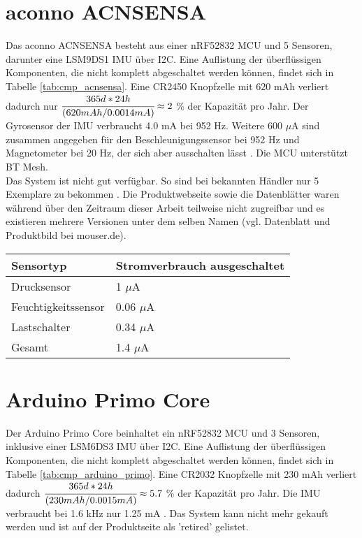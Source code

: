 \section{aconno ACNSENSA}
Das aconno ACNSENSA besteht aus einer nRF52832 MCU und 5 Sensoren, darunter eine LSM9DS1 IMU über I2C.
Eine Auflistung der überflüssigen Komponenten, die nicht komplett abgeschaltet werden können, findet sich in Tabelle \ref{tab:cmp_acnsensa}.
Eine CR2450 Knopfzelle mit 620 mAh verliert dadurch nur $\cfrac{365d*24h}{(620mAh/0.0014mA)} \approx 2$ \% der Kapazität pro Jahr.
Der Gyrosensor der IMU verbraucht 4.0 mA bei 952 Hz.
Weitere 600 $\mu$A sind zusammen angegeben für den Beschleunigungssensor bei 952 Hz und Magnetometer bei 20 Hz, der sich aber ausschalten lässt \cite{datasheet_lsm9ds1}.
Die MCU unterstützt BT Mesh. \cite{datasheet_acnsensa}\\
Das System ist nicht gut verfügbar.
So sind bei bekannten Händler nur 5 Exemplare zu bekommen \cite{site_mouserAcnsensa}.
Die Produktwebseite sowie die Datenblätter waren während über den Zeitraum dieser Arbeit teilweise nicht zugreifbar und es existieren mehrere Versionen unter dem selben Namen (vgl. Datenblatt und Produktbild bei mouser.de).

\begin{minipage}{\linewidth}
	\label{tab:cmp_acnsensa}
	\begin{tabularx}{\linewidth}{X|X}
		Sensortyp & Stromverbrauch ausgeschaltet\\
		\hline
    Drucksensor & 1 $\mu$A \cite{datasheet_acnsensa}\\
    Feuchtigkeitssensor & 0.06 $\mu$A \cite{datasheet_acnsensa}\\
    Lastschalter & 0.34 $\mu$A \cite{datasheet_sip32401a}\\
    \hline
    Gesamt & 1.4 $\mu$A\\
  \end{tabularx}
\end{minipage}

\section{Arduino Primo Core}
Der Arduino Primo Core beinhaltet ein nRF52832 MCU und 3 Sensoren, inklusive einer LSM6DS3 IMU über I2C.
Eine Auflistung der überflüssigen Komponenten, die nicht komplett abgeschaltet werden können, findet sich in Tabelle \ref{tab:cmp_arduino_primo}.
Eine CR2032 Knopfzelle mit 230 mAh verliert dadurch $\cfrac{365d*24h}{(230mAh/0.0015mA)} \approx 5.7$ \% der Kapazität pro Jahr.
Die IMU verbraucht bei 1.6 kHz nur 1.25 mA \cite{datasheet_lsm6ds3}.
Das System kann nicht mehr gekauft werden und ist auf der Produktseite als 'retired' gelistet.\cite{site_primo} \cite{datasheet_primo}

